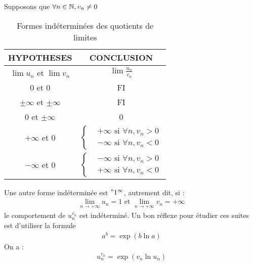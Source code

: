\begin{remarque}
    Supposons que $\forall n \in \mathbb{N}, v_n \neq 0$
    \begin{table}[!h]
    \centering
    \begin{tabular}{cc}
        HYPOTHESES & CONCLUSION \\
        \hline 
        $\lim u_n$ et $\lim v_n$ & $\lim \frac{u_n}{v_n}$ \\
        $0$ et $0$ & FI \\
        $\pm \infty$ et $\pm \infty$ & FI \\
        $0$ et $\pm \infty$ & 0 \\
        $+\infty$ et $0$ & $\begin{cases} 
                             &+\infty \text{ si } \forall n, v_n > 0 \\
                             &-\infty \text{ si } \forall n, v_n < 0 
                            \end{cases}$ \\
        $-\infty$ et $0$ & $\begin{cases}
                                &-\infty \text{ si } \forall n, v_n > 0 \\
                                &+\infty \text{ si } \forall n, v_n < 0
                            \end{cases}$ \\
                            \hline
    \end{tabular}
    \caption{Formes indéterminées des quotients de limites}
\end{table}
\end{remarque}

\begin{remarque}
    Une autre forme indéterminée est $"1^{\infty}$, autrement dit, si :
    \begin{align*}
        \lim_{n \to +\infty} u_n = 1 \text{ et } \lim_{n \to +\infty} v_n = +\infty
    \end{align*}
    le comportement de $u_n^{v_n}$ est indéterminé. Un bon réflexe pour étudier ces suites est d'utiliser la formule 
    \begin{align*}
        a^b = \exp(b\ln a)
    \end{align*}
    On a :
    \begin{align*}
        u_n^{v_n} = \exp(v_n \ln u_n)
    \end{align*}
\end{remarque}

